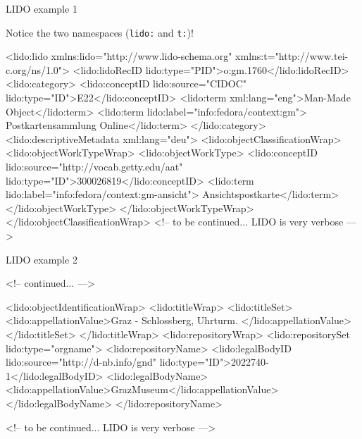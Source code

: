 \begin{frame}[fragile]{LIDO example 1}

{\scriptsize Notice the two namespaces (\texttt{lido:} and \texttt{t:})! }
    
\begin{xmlcode}
<lido:lido 
  xmlns:lido="http://www.lido-schema.org" 
  xmlns:t="http://www.tei-c.org/ns/1.0">
  <lido:lidoRecID lido:type="PID">o:gm.1760</lido:lidoRecID>
  <lido:category>
    <lido:conceptID lido:source="CIDOC" 
                    lido:type="ID">E22</lido:conceptID>
    <lido:term xml:lang="eng">Man-Made Object</lido:term>
    <lido:term lido:label="info:fedora/context:gm">
      Postkartensammlung Online</lido:term>
  </lido:category>
  <lido:descriptiveMetadata xml:lang="deu">
    <lido:objectClassificationWrap>
      <lido:objectWorkTypeWrap>
        <lido:objectWorkType>
          <lido:conceptID lido:source="http://vocab.getty.edu/aat"
            lido:type="ID">300026819</lido:conceptID>
          <lido:term lido:label="info:fedora/context:gm-ansicht">
            Ansichtspostkarte</lido:term>
        </lido:objectWorkType>
      </lido:objectWorkTypeWrap>
    </lido:objectClassificationWrap>
    <!-- to be continued... LIDO is very verbose --->
\end{xmlcode}

\end{frame}


\begin{frame}[fragile]{LIDO example 2}

\begin{xmlcode}
<!-- continued... --->

    <lido:objectIdentificationWrap>
      <lido:titleWrap>
        <lido:titleSet>
          <lido:appellationValue>Graz - Schlossberg, Uhrturm.
             </lido:appellationValue>
        </lido:titleSet>
      </lido:titleWrap>
      <lido:repositoryWrap>
        <lido:repositorySet lido:type="orgname">
          <lido:repositoryName>
            <lido:legalBodyID lido:source="http://d-nb.info/gnd"
              lido:type="ID">2022740-1</lido:legalBodyID>
            <lido:legalBodyName>
              <lido:appellationValue>GrazMuseum</lido:appellationValue>
            </lido:legalBodyName>
          </lido:repositoryName>
          
    <!-- to be continued... LIDO is very verbose --->
\end{xmlcode}

\end{frame}
